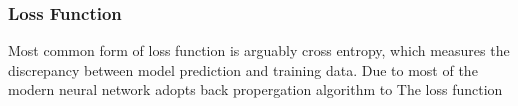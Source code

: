 \subsubsection{Loss Function}

Most common form of loss function is arguably cross entropy, which measures the discrepancy between model prediction and training data. Due to most of the modern neural network adopts back propergation algorithm to The loss function 